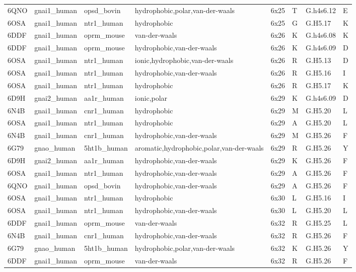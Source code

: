 \begin{landscape}
\begin{longtable}{llllllll}
6QNO & gnai1\_human & opsd\_bovin & hydrophobic,polar,van-der-waals & 6x25 & T & G.h4s6.12 & E\\
\addlinespace
6OSA & gnai1\_human & ntr1\_human & hydrophobic & 6x25 & G & G.H5.17 & K\\
6DDF & gnai1\_human & oprm\_mouse & van-der-waals & 6x26 & K & G.h4s6.08 & K\\
6DDF & gnai1\_human & oprm\_mouse & hydrophobic,van-der-waals & 6x26 & K & G.h4s6.09 & D\\
6OSA & gnai1\_human & ntr1\_human & ionic,hydrophobic,van-der-waals & 6x26 & R & G.H5.13 & D\\
6OSA & gnai1\_human & ntr1\_human & hydrophobic,van-der-waals & 6x26 & R & G.H5.16 & I\\
\addlinespace
6OSA & gnai1\_human & ntr1\_human & hydrophobic & 6x26 & R & G.H5.17 & K\\
6D9H & gnai2\_human & aa1r\_human & ionic,polar & 6x29 & K & G.h4s6.09 & D\\
6N4B & gnai1\_human & cnr1\_human & hydrophobic & 6x29 & M & G.H5.20 & L\\
6OSA & gnai1\_human & ntr1\_human & hydrophobic & 6x29 & A & G.H5.20 & L\\
6N4B & gnai1\_human & cnr1\_human & hydrophobic,van-der-waals & 6x29 & M & G.H5.26 & F\\
\addlinespace
6G79 & gnao\_human & 5ht1b\_human & aromatic,hydrophobic,polar,van-der-waals & 6x29 & R & G.H5.26 & Y\\
6D9H & gnai2\_human & aa1r\_human & hydrophobic,van-der-waals & 6x29 & K & G.H5.26 & F\\
6OSA & gnai1\_human & ntr1\_human & hydrophobic,van-der-waals & 6x29 & A & G.H5.26 & F\\
6QNO & gnai1\_human & opsd\_bovin & hydrophobic,van-der-waals & 6x29 & A & G.H5.26 & F\\
6OSA & gnai1\_human & ntr1\_human & hydrophobic & 6x30 & L & G.H5.16 & I\\
\addlinespace
6OSA & gnai1\_human & ntr1\_human & hydrophobic,van-der-waals & 6x30 & L & G.H5.20 & L\\
6DDF & gnai1\_human & oprm\_mouse & van-der-waals & 6x32 & R & G.H5.25 & L\\
6N4B & gnai1\_human & cnr1\_human & hydrophobic,van-der-waals & 6x32 & R & G.H5.26 & F\\
6G79 & gnao\_human & 5ht1b\_human & hydrophobic,polar,van-der-waals & 6x32 & K & G.H5.26 & Y\\
6DDF & gnai1\_human & oprm\_mouse & van-der-waals & 6x32 & R & G.H5.26 & F\\

\end{longtable}
\end{landscape}
